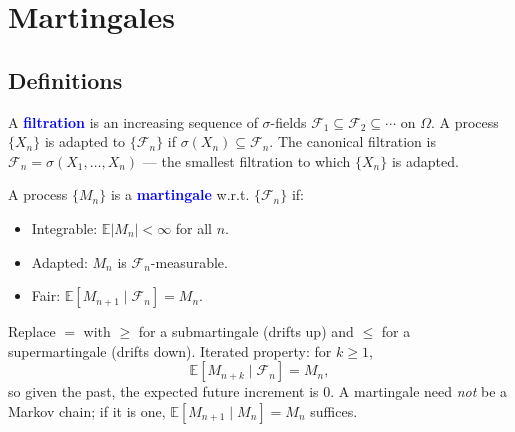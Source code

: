 \section{Martingales}
\subsection{Definitions}
A \textcolor{Blue}{\textbf{filtration}} is an increasing sequence of
$\sigma$-fields $\mathcal{F}_1 \subseteq \mathcal{F}_2 \subseteq \cdots$ on
$\Omega$. A process $\{X_n\}$ is \textcolor{Bittersweet}{adapted} to
$\{\mathcal{F}_n\}$ if $\sigma(X_n) \subseteq \mathcal{F}_n$. The
\textcolor{Bittersweet}{canonical filtration} is
$\mathcal{F}_n = \sigma(X_1, \ldots, X_n)$ — the smallest filtration to
which $\{X_n\}$ is adapted.

A process $\{M_n\}$ is a \textcolor{Blue}{\textbf{martingale}} w.r.t.
$\{\mathcal{F}_n\}$ if:
\begin{itemize}
  \item \textcolor{Bittersweet}{Integrable}: $\mathbb{E}|M_n| < \infty$ for all $n$.
  \item \textcolor{Bittersweet}{Adapted}: $M_n$ is $\mathcal{F}_n$-measurable.
  \item \textcolor{Bittersweet}{Fair}: $\mathbb{E}[M_{n+1} \mid \mathcal{F}_n] = M_n$.
\end{itemize}
Replace $=$ with $\ge$ for a \textcolor{Bittersweet}{submartingale} (drifts up)
and $\le$ for a \textcolor{Bittersweet}{supermartingale} (drifts down).
\textcolor{Bittersweet}{Iterated property}: for $k \ge 1$,
\[\mathbb{E}[M_{n+k} \mid \mathcal{F}_n] = M_n,\]
so given the past, the expected future increment is $0$. A martingale need
\emph{not} be a Markov chain; if it is one,
$\mathbb{E}[M_{n+1} \mid M_n] = M_n$ suffices.

